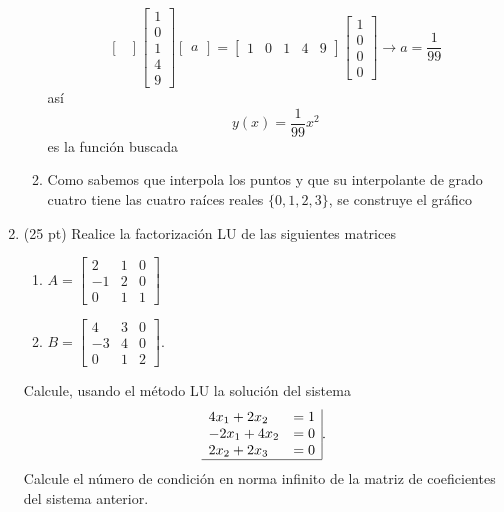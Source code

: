 \documentclass[11pt]{article}
\begin{document}
\begin{enumerate}
\begin{enumerate}
$$\begin{bmatrix}
    \end{bmatrix}
        \begin{bmatrix}
    1\\0 \\ 1 \\4\\9
    \end{bmatrix}
    \begin{bmatrix}a\end{bmatrix}=
    \begin{bmatrix}
    1 & 0 & 1 & 4 & 9
    \end{bmatrix}
    \begin{bmatrix}
    1 \\ 0 \\ 0 \\ 0
    \end{bmatrix}
    \rightarrow 
    a=\frac{1}{99} 
    $$
    as\'i
    $$y(x)=\frac{1}{99}x^2$$
    es la funci\'on buscada \fbox{5pt}
    \item Como sabemos que interpola los puntos y que su interpolante de grado cuatro tiene las cuatro ra\'ices reales $\{0,1,2,3\}$, se construye el gr\'afico
\begin{center}
\end{center}
\end{enumerate}

\item (25 pt) Realice la factorizaci\'on LU de las siguientes matrices
\begin{multicols}{2}
\begin{enumerate}
	\item $A=\begin{bmatrix}
    		2 & 1 & 0 \\ 
            -1 & 2 & 0\\
            0 & 1 & 1
            \end{bmatrix}$
    \item $B=\begin{bmatrix}
    		4 & 3 & 0 \\
            -3 & 4 & 0\\
            0 & 1 & 2
            \end{bmatrix}$.
\end{enumerate}
\end{multicols}
Calcule, usando el m\'etodo LU la soluci\'on del sistema
$$
\begin{array}{ll|}
4x_1+2x_2		& = 1 \\
-2x_1+4x_2		& = 0 \\
2x_2+2x_3		& = 0 \\ \hline
\end{array}.
$$
Calcule el n\'umero de condici\'on en norma infinito de la matriz de coeficientes del sistema anterior.


\end{enumerate}
\end{document}
